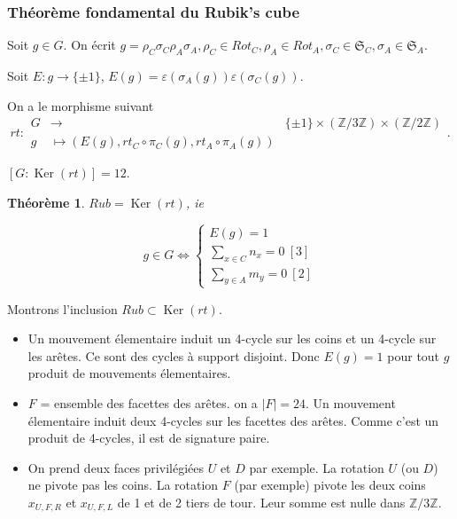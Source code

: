 \documentclass[10pt,notheorems]{beamer}
\theoremstyle{plain}
\newtheorem{theorem}{Théorème}[section]
\theoremstyle{definition}
\theoremstyle{plain}
\theoremstyle{plain}
\theoremstyle{plain}
\theoremstyle{remark}
\begin{document}
\begin{frame}
  \frametitle{Théorème fondamental du Rubik's cube}
  Soit $g \in G$. On écrit $g = \rho_C \sigma_C \rho_A \sigma_A, \rho_C \in Rot_C, \rho_A \in Rot_A, \sigma_C \in \mathfrak{S}_{C}, \sigma_A \in \mathfrak{S}_{A}$.

  Soit $E : g \to \{ \pm 1 \} $, $E(g) = \varepsilon (\sigma_A(g)) \varepsilon (\sigma_C(g))$.

  On a le morphisme suivant \begin{equation*}
  rt :
   \begin{array}{lll}
   G & \longrightarrow & \{ \pm 1 \} \times (\mathbb{Z}/{ 3 }\mathbb{Z}) \times (\mathbb{Z}/{ 2 }\mathbb{Z}) \\
   g & \longmapsto (E (g), rt_C \circ \pi_C(g), rt_A \circ \pi_A(g))
   \end{array}.
  \end{equation*}

  $[G : \operatorname{Ker}(rt)] = 12$.

  \begin{theorem}
    $Rub=\operatorname{Ker}(rt)$, ie

    $$ g \in G \iff \left \lbrace \begin{matrix}
    E (g)=1 \\
    \sum_{x \in C} n_x = 0 \ [3] \\
    \sum_{y \in A} m_y = 0 \ [2]
    \end{matrix} \right.$$
  \end{theorem}
\end{frame}

\begin{frame}
  Montrons l'inclusion $Rub \subset \operatorname{Ker}(rt)$.

  \begin{itemize}
    \item Un mouvement élementaire induit un 4-cycle sur les coins et un 4-cycle sur les arêtes. Ce sont des cycles à support disjoint. Donc $E(g) =1$ pour tout $g $ produit de mouvements élementaires.
    \item $F$ = ensemble des facettes des arêtes. on a $\mid F \mid = 24$. Un mouvement élementaire induit deux 4-cycles sur les facettes des arêtes. Comme c'est un produit de 4-cycles, il est de signature paire.
    \item On prend deux faces privilégiées $U$ et $D$ par exemple. La rotation $U$ (ou $D$) ne pivote pas les coins. La rotation $F$ (par exemple) pivote les deux coins $x _{U,F,R}$ et $x _{U,F,L}$ de 1 et de 2 tiers de tour. Leur somme est nulle dans $\mathbb{Z}/{ 3 }\mathbb{Z}$.
  \end{itemize}
\end{frame}
\end{document}

